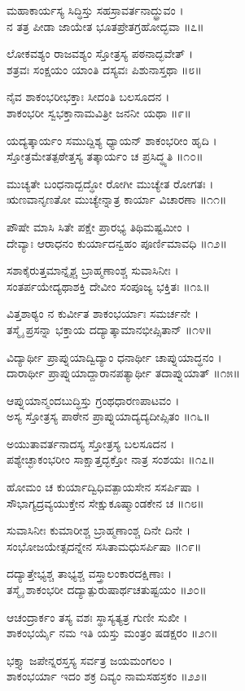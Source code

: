 ಮಹಾಕಾರ್ಯಸ್ಯ ಸಿದ್ಧಿಸ್ತು ಸಹಸ್ರಾವರ್ತನಾದ್ಧ್ರುವಂ ।\\
ನ ತತ್ರ ಪೀಡಾ ಜಾಯೇತ ಭೂತಪ್ರೇತಗ್ರಹೋದ್ಭವಾ ॥೭॥

ಲೋಕವಶ್ಯಂ ರಾಜವಶ್ಯಂ ಸ್ತೋತ್ರಸ್ಯ ಪಠನಾದ್ಭವೇತ್ ।\\
ಶತ್ರವಃ ಸಂಕ್ಷಯಂ ಯಾಂತಿ ದಸ್ಯವಃ ಪಿಶುನಾಸ್ತಥಾ ॥೮॥

ನೈವ ಶಾಕಂಭರೀಭಕ್ತಾಃ ಸೀದಂತಿ ಬಲಸೂದನ ।\\
ಶಾಕಂಭರೀ ಸ್ವಭಕ್ತಾನಾಮವಿತ್ರೀ ಜನನೀ ಯಥಾ ॥೯॥

ಯದ್ಯತ್ಕಾರ್ಯಂ ಸಮುದ್ದಿಶ್ಯ ಧ್ಯಾಯನ್ ಶಾಕಂಭರೀಂ ಹೃದಿ ।\\
ಸ್ತೋತ್ರಮೇತತ್ಪಠೇತ್ತಸ್ಯ ತತ್ಕಾರ್ಯಂ ಚ ಪ್ರಸಿದ್ಧ್ಯತಿ ॥೧೦॥

ಮುಚ್ಯತೇ ಬಂಧನಾದ್ಬದ್ಧೋ ರೋಗೀ ಮುಚ್ಯೇತ ರೋಗತಃ ।\\
ಋಣವಾನೃಣತೋ ಮುಚ್ಯೇನ್ನಾತ್ರ ಕಾರ್ಯಾ ವಿಚಾರಣಾ ॥೧೧॥

ಪೌಷೇ ಮಾಸಿ ಸಿತೇ ಪಕ್ಷೇ ಪ್ರಾರಭ್ಯ ತಿಥಿಮಷ್ಟಮೀಂ ।\\
ದೇವ್ಯಾಃ ಆರಾಧನಂ ಕುರ್ಯಾದನ್ವಹಂ ಪೂರ್ಣಿಮಾವಧಿ ॥೧೨॥

ಸಶಾಕೈರುತ್ತಮಾನ್ನೈಶ್ಚ ಬ್ರಾಹ್ಮಣಾಂಶ್ಚ ಸುವಾಸಿನೀಃ ।\\
ಸಂತರ್ಪಯೇದ್ಯಥಾಶಕ್ತಿ ದೇವೀಂ ಸಂಪೂಜ್ಯ ಭಕ್ತಿತಃ ॥೧೩॥

ವಿತ್ತಶಾಠ್ಯಂ ನ ಕುರ್ವೀತ ಶಾಕಂಭರ್ಯಾಃ ಸಮರ್ಚನೇ ।\\
ತಸ್ಮೈ ಪ್ರಸನ್ನಾ ಭಕ್ತಾಯ ದದ್ಯಾತ್ಕಾಮಾನಭೀಪ್ಸಿತಾನ್ ॥೧೪॥

ವಿದ್ಯಾರ್ಥೀ ಪ್ರಾಪ್ನುಯಾದ್ವಿದ್ಯಾಂ ಧನಾರ್ಥೀ ಚಾಪ್ನುಯಾದ್ಧನಂ ।\\
ದಾರಾರ್ಥೀ ಪ್ರಾಪ್ನುಯಾದ್ದಾರಾನಪತ್ಯಾರ್ಥೀ ತದಾಪ್ನುಯಾತ್ ॥೧೫॥

ಆಪ್ನುಯಾನ್ಮಂದಬುದ್ಧಿಸ್ತು ಗ್ರಂಥಧಾರಣಪಾಟವಂ ।\\
ಅಸ್ಯ ಸ್ತೋತ್ರಸ್ಯ ಪಾಠೇನ ಪ್ರಾಪ್ನುಯಾದ್ಯದ್ಯದೀಪ್ಸಿತಂ ॥೧೬॥

ಅಯುತಾವರ್ತನಾದಸ್ಯ ಸ್ತೋತ್ರಸ್ಯ ಬಲಸೂದನ ।\\
ಪಶ್ಯೇಚ್ಛಾಕಂಭರೀಂ ಸಾಕ್ಷಾತ್ತದ್ಭಕ್ತೋ ನಾತ್ರ ಸಂಶಯಃ ॥೧೭॥

ಹೋಮಂ ಚ ಕುರ್ಯಾದ್ವಿಧಿವತ್ಪಾಯಸೇನ ಸಸರ್ಪಿಷಾ ।\\
ಸೌಭಾಗ್ಯದ್ರವ್ಯಯುಕ್ತೇನ ಸೇಕ್ಷುಕೂಷ್ಮಾಂಡಕೇನ ಚ ॥೧೮॥

ಸುವಾಸಿನೀಃ ಕುಮಾರೀಶ್ಚ ಬ್ರಾಹ್ಮಣಾಂಶ್ಚ ದಿನೇ ದಿನೇ ।\\
ಸಂಭೋಜಯೇತ್ಸದನ್ನೇನ ಸಸಿತಾಮಧುಸರ್ಪಿಷಾ ॥೧೯॥

ದದ್ಯಾತ್ತೇಭ್ಯಶ್ಚ ತಾಭ್ಯಶ್ಚ ವಸ್ತ್ರಾಲಂಕಾರದಕ್ಷಿಣಾಃ ।\\
ತಸ್ಮೈ ಶಾಕಂಭರೀ ದದ್ಯಾತ್ಪುರುಷಾರ್ಥಚತುಷ್ಟಯಂ ॥೨೦॥

ಆಚಂದ್ರಾರ್ಕಂ ತಸ್ಯ ವಶಃ ಸ್ಥಾಸ್ಯತ್ಯತ್ರ ಗುಣೀ ಸುಖೀ ।\\
ಶಾಕಂಭರ್ಯೈ ನಮ ಇತಿ ಯಸ್ತು ಮಂತ್ರಂ ಷಡಕ್ಷರಂ ॥೨೧॥

ಭಕ್ತ್ಯಾ ಜಪೇನ್ನರಸ್ತಸ್ಯ ಸರ್ವತ್ರ ಜಯಮಂಗಲಂ ।\\
ಶಾಕಂಭರ್ಯಾ ಇದಂ ಶಕ್ರ ದಿವ್ಯಂ ನಾಮಸಹಸ್ರಕಂ ॥೨೨॥

